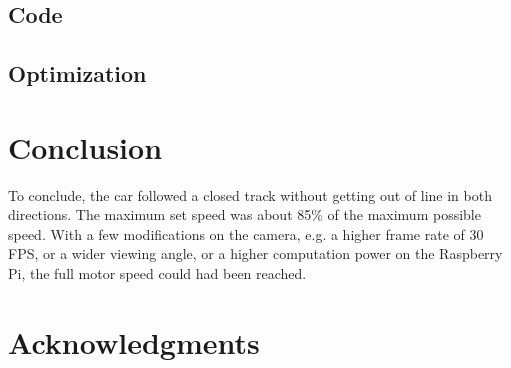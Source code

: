 \documentclass[11pt,twocolumn]{article}
\begin{document}
\subsection{Code}
\subsection{Optimization}

\section{Conclusion}
To conclude, the car followed a closed track without getting out of line in both directions. The maximum set speed was about 85\% of the maximum possible speed. With a few modifications on the camera, e.g. a higher frame rate of 30 FPS, or a wider viewing angle, or a higher computation power on the Raspberry Pi, the full motor speed could had been reached.

\section*{Acknowledgments}


\begin{small}


\end{small}
\end{document}

